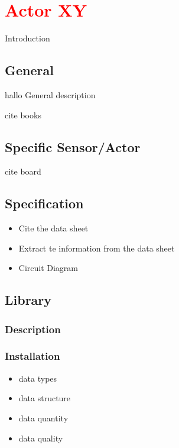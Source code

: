 %
%

\chapter{\textcolor{red}{Actor XY}}

Introduction

\section{General}
hallo
General description

cite books

\section{Specific Sensor/Actor}

cite board

\section{Specification}

\begin{itemize}
  \item Cite the data sheet
  \item Extract te information from the data sheet
  \item Circuit Diagram
\end{itemize}

\section{Library}

\subsection{Description}

\subsection{Installation}

\begin{itemize}
    \item data types
    \item data structure
    \item data quantity
    \item data quality
\end{itemize}

